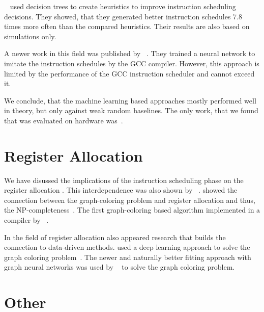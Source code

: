 \citeauthor{russell2006learning}~\cite{russell2006learning} used decision trees to create heuristics to improve instruction scheduling decisions.
They showed, that they generated better instruction schedules 7.8 times more often than the compared heuristics.
Their results are also based on simulations only.

A newer work in this field was published by \citeauthor{jain2019learning}~\cite{jain2019learning}.
They trained a neural network to imitate the instruction schedules by the GCC compiler.
However, this approach is limited by the performance of the GCC instruction scheduler and cannot exceed it.

We conclude, that the machine learning based approaches mostly performed well in theory, but only against weak random baselines.
The only work, that we found that was evaluated on hardware was~\cite{beaty1996using}.


\section{Register Allocation}
\label{sec:rw:register-allocation}
We have disussed the implications of the instruction scheduling phase on the register allocation .
This interdependence was also shown by \citeauthor{goodman1988code}~\cite{goodman1988code}.
\citeauthor{lavrov1962store} showed the connection between the graph-coloring problem and register allocation and thus, the NP-completeness~\cite{lavrov1962store}.
The first graph-coloring based algorithm implemented in a compiler by \citeauthor{chaitin1982register}~\cite{chaitin1982register}.

In the field of register allocation also appeared research that builds the connection to data-driven methods.
\citeauthor{das2019deep} used a deep learning approach to solve the graph coloring problem~\cite{das2019deep}.
The newer and naturally better fitting approach with graph neural networks was used by \citeauthor{lemos2019graph}~\cite{lemos2019graph} to solve the graph coloring problem. 

\section{Other}
\label{sec:rw:other}
